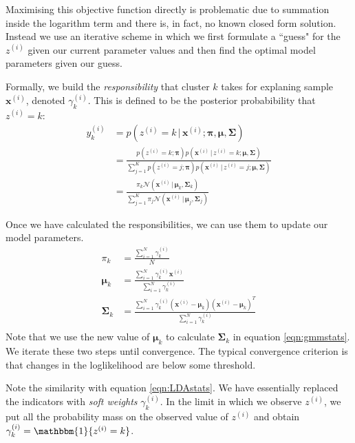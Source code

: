 \documentclass[final,3p,times,twocolumn]{elsarticle}
\begin{document}
Maximising this objective function directly is problematic due to summation inside the logarithm term and there is, in fact, no known closed form solution.
Instead we use an iterative scheme in which we first formulate a ``guess" for the $z^{(i)}$ given our current parameter values and then find the optimal model parameters given our guess. 

Formally, we build the \emph{responsibility} that cluster $k$ takes for explaning sample $\boldsymbol x^{(i)}$, denoted $\gamma_k^{(i)}$.
This is defined to be the posterior probabibility that $z^{(i)} = k$:
\begin{equation}
\label{eqn:gmmresponsibility}
\begin{split}
y_k^{(i)} &= p(z^{(i)}=k\,|\,\boldsymbol x^{(i)}; \boldsymbol \pi, \boldsymbol \mu, \boldsymbol \Sigma)\\
	&= \frac{p(z^{(i)}=k;\boldsymbol \pi)p(\boldsymbol x^{(i)}\,|\,z^{(i)}=k;\boldsymbol \mu, \boldsymbol \Sigma)}
	{\sum_{j=1}^K p(z^{(i)}=j;\boldsymbol \pi)p(\boldsymbol x^{(i)}\,|\,z^{(i)}=j;\boldsymbol \mu, \boldsymbol \Sigma)}\\
	&= \frac{\pi_k\mathcal{N}(\boldsymbol x^{(i)}\,|\,\boldsymbol \mu_k, \boldsymbol \Sigma_k)}
	{\sum_{j=1}^K \pi_j\mathcal{N}(\boldsymbol x^{(i)}\,|\,\boldsymbol \mu_j, \boldsymbol \Sigma_j)}
\end{split}
\end{equation}

Once we have calculated the responsibilities, we can use them to update our model parameters.
\begin{equation}
\label{eqn:gmmstats}
\begin{split}
\pi_k &= \frac{\sum_{i=1}^N \gamma_k^{(i)}}{N}\\
\boldsymbol \mu_k &= \frac{\sum_{i=1}^N \gamma_k^{(i)} \boldsymbol x^{(i)}}{\sum_{i=1}^N \gamma_k^{(i)}}\\
\boldsymbol \Sigma_k &= \frac{\sum_{i=1}^N \gamma_k^{(i)}(\boldsymbol x^{(i)} - \boldsymbol \mu_k)(\boldsymbol x^{(i)} - \boldsymbol \mu_k)^T}{\sum_{i=1}^N \gamma_k^{(i)}}\\
\end{split}
\end{equation}
Note that we use the new value of $\boldsymbol \mu_k$ to calculate $\boldsymbol \Sigma_k$ in equation \ref{eqn:gmmstats}.
We iterate these two steps until convergence.
The typical convergence criterion is that changes in the loglikelihood are below some threshold.

Note the similarity with equation \ref{eqn:LDAstats}.
We have essentially replaced the indicators with \emph{soft weights} $\gamma_k^{(i)}$.
In the limit in which we observe $z^{(i)}$, we put all the probability mass on the observed value of $z^{(i)}$ and obtain $\gamma_k^{(i)} = \mathbbm{1}\{z^{(i)} = k\}$.
\end{document}
